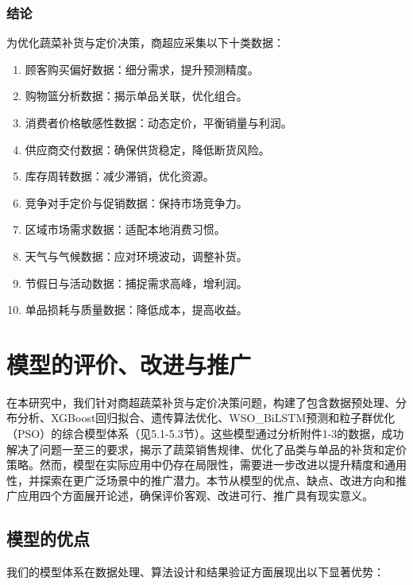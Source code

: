 \documentclass{cumcmthesis} %
\begin{document}
\subsubsection{结论}

为优化蔬菜补货与定价决策，商超应采集以下十类数据：

\begin{enumerate}
\item 顾客购买偏好数据：细分需求，提升预测精度。
\item 购物篮分析数据：揭示单品关联，优化组合。
\item 消费者价格敏感性数据：动态定价，平衡销量与利润。
\item 供应商交付数据：确保供货稳定，降低断货风险。
\item 库存周转数据：减少滞销，优化资源。
\item 竞争对手定价与促销数据：保持市场竞争力。
\item 区域市场需求数据：适配本地消费习惯。
\item 天气与气候数据：应对环境波动，调整补货。
\item 节假日与活动数据：捕捉需求高峰，增利润。
\item 单品损耗与质量数据：降低成本，提高收益。
\end{enumerate}

\section{模型的评价、改进与推广}

在本研究中，我们针对商超蔬菜补货与定价决策问题，构建了包含数据预处理、分布分析、XGBoost回归拟合、遗传算法优化、WSO\_BiLSTM预测和粒子群优化（PSO）的综合模型体系（见5.1-5.3节）。这些模型通过分析附件1-3的数据，成功解决了问题一至三的要求，揭示了蔬菜销售规律、优化了品类与单品的补货和定价策略。然而，模型在实际应用中仍存在局限性，需要进一步改进以提升精度和通用性，并探索在更广泛场景中的推广潜力。本节从模型的优点、缺点、改进方向和推广应用四个方面展开论述，确保评价客观、改进可行、推广具有现实意义。

\subsection{模型的优点}

我们的模型体系在数据处理、算法设计和结果验证方面展现出以下显著优势：
\end{document}
